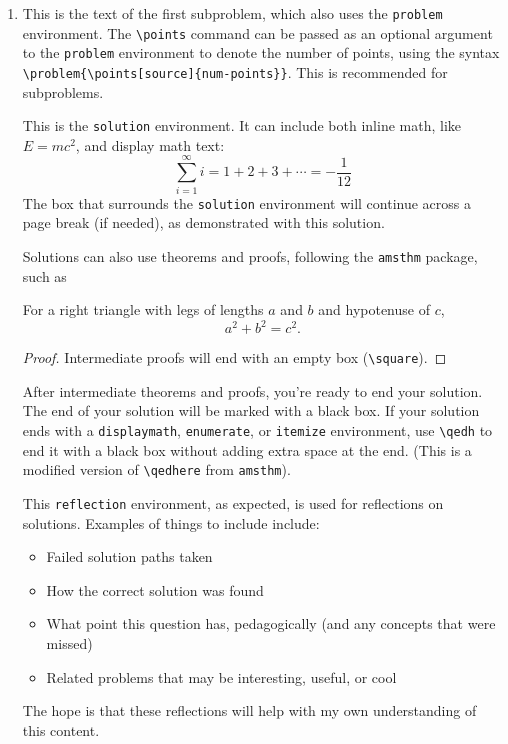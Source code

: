 \documentclass[11pt]{article}
\begin{document}
	\begin{enumerate}
		\item
		\begin{problem}{}
		This is the text of the first subproblem, which also uses the \texttt{problem} environment. The \texttt{\textbackslash points} command can be passed as an optional argument to the \texttt{problem} environment to denote the number of points, using the syntax \texttt{\textbackslash problem\{\textbackslash points[source]\{num-points\}\}}. This is recommended for subproblems.
		\end{problem}
		\begin{solution}
		This is the \texttt{solution} environment. It can include both inline math, like \(E=mc^2\), and display math text:
		\[
		\sum_{i=1}^{\infty} i = 1 + 2 + 3 + \cdots = -\frac{1}{12}
		\]
		The box that surrounds the \texttt{solution} environment will continue across a page break (if needed), as demonstrated with this solution.
		
		Solutions can also use theorems and proofs, following the \texttt{amsthm} package, such as
		
		\begin{theorem}[Pythagoras]
			For a right triangle with legs of lengths $a$ and $b$ and hypotenuse of $c$, $$a^2 + b^2 = c^2.$$
		\end{theorem}

		\begin{proof}
		Intermediate proofs will end with an empty box (\texttt{\textbackslash square}).
		\end{proof}

		After intermediate theorems and proofs, you're ready to end your solution. The end of your solution will be marked with a black box. If your solution ends with a \texttt{displaymath}, \texttt{enumerate}, or \texttt{itemize} environment, use \texttt{\textbackslash qedh} to end it with a black box without adding extra space at the end. (This is a modified version of \texttt{\textbackslash qedhere} from \texttt{amsthm}).
		\end{solution}
		\begin{reflection} This \texttt{reflection} environment, as expected, is used for reflections on solutions. Examples of things to include include:
		\begin{itemize}
			\item Failed solution paths taken
			\item How the correct solution was found
			\item What point this question has, pedagogically (and any concepts that were missed)
			\item Related problems that may be interesting, useful, or cool
		\end{itemize}
		The hope is that these reflections will help with my own understanding of this content.
		\end{reflection}
	

\end{enumerate}
\end{document}
